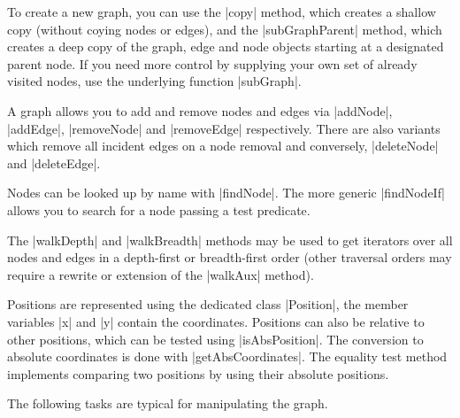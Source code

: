 To create a new graph, you can use the |copy| method, which creates a 
shallow copy (without coying nodes or edges), and the
|subGraphParent| method, which creates a deep copy of the graph, edge
and node objects starting at a designated parent node. If you need
more control by supplying your own set of already visited nodes, use
the underlying function |subGraph|.

A graph allows you to add and remove nodes and edges via |addNode|,
|addEdge|, |removeNode| and |removeEdge| respectively.  There are also
variants which remove all incident edges on a node removal and
conversely, |deleteNode| and |deleteEdge|.

Nodes can be looked up by name with |findNode|. The more generic
|findNodeIf| allows you to search for a node passing a test
predicate. 

The |walkDepth| and |walkBreadth| methods may be used to get
iterators over all nodes and edges in a depth-first or breadth-first
order (other traversal orders may require a rewrite or extension of the
|walkAux| method).

Positions are represented using the dedicated class |Position|, the member
variables |x| and |y| contain the coordinates.  Positions can also be
relative to other positions, which can be tested using |isAbsPosition|.
The conversion to absolute coordinates is done with |getAbsCoordinates|.
The equality test method implements comparing two positions by using their
absolute positions.

The following tasks are typical for manipulating the graph.

